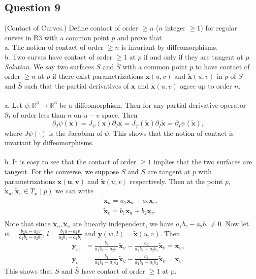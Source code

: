 \documentclass[12pt]{article}
\begin{document}
\subsection*{Question 9}
(Contact of Curves.) Define contact of order $\geq n$ ($n$ integer $\geq 1$) for regular curves in R3 with a common point $p$ and prove that\\
a. The notion of contact of order $\geq n$ is invariant by diffeomorphisms.\\
b. Two curves have contact of order $\geq 1$ at $p$ if and only if they are tangent at $p$.\\

\textit{Solution.} We say two surfaces $S$ and $\bar{S}$ with a common point $p$ to have contact of order $\geq n$ at $p$ if there exist parametrizations $\mathbf{x}(u, v)$ and $\mathbf{\tilde{x}}(u,v)$ in $p$ of $S$ and $\bar{S}$ such that the partial derivatives of $\mathbf{x}$ and $\mathbf{\tilde{x}}(u,v)$ agree up to order $n$.\\\\
a. Let $\psi:\mathbb{R}^3 \to \mathbb{R}^3$ be a diffeomorphism. Then for any partial derivative operator $\partial_I$ of order less than $n$ on $u-v$ space. Then \begin{equation*}
    \partial_I\psi(\mathbf{x}) = J_\psi(\mathbf{x})\partial_I\mathbf{x} = J_\psi(\mathbf{\tilde{x}})\partial_I\mathbf{\tilde{x}} = \partial_I\psi(\mathbf{\tilde{x}}),
\end{equation*}
where $J\psi(\cdot)$ is the Jacobian of $\psi$. This shows that the notion of contact is invariant by diffeomorphisms.\\\\
b. It is easy to see that the contact of order $\geq 1$ implies that the two surfaces are tangent. For the converse, we suppose $S$ and $\bar{S}$ are tangent at $p$ with parametrizations $\mathbf{x(u,v)}$ and $\mathbf{\tilde{x}}(u,v)$ respectively. Then at the point $p$, $\mathbf{\tilde{x}}_u, \mathbf{\tilde{x}}_v \in T_{\mathbf{x}}(p)$ we can write \begin{align*}
    &\mathbf{\tilde{x}}_u = a_1 \mathbf{x}_u + a_2 \mathbf{x}_v,\\
    &\mathbf{\tilde{x}}_v = b_1 \mathbf{x}_u + b_2 \mathbf{x}_v.\\
\end{align*}
Note that since $\mathbf{\tilde{x}}_u, \mathbf{\utilde{x}}_v$ are linearly independent, we have $a_1b_2-a_2b_1\neq 0$. Now let $w = \frac{b_2u-a_2v}{a_1b_2-a_2b_1}$, $l = \frac{b_1u-a_1v}{a_2b_1-a_1b_2}$ and $\mathbf{{y}}(w,l) = \mathbf{\tilde{x}}(u,v)$. Then \begin{align*}
    \mathbf{y}_w &= \frac{b_2}{a_1b_2-a_2b_1}\mathbf{\tilde{x}}_u-\frac{a_2}{a_1b_2-a_2b_1}\mathbf{\tilde{x}}_v=\mathbf{x}_u,\\
    \mathbf{y}_l &=
    \frac{b_1}{a_2b_1-a_1b_2}\mathbf{\tilde{x}}_u-\frac{a_1}{a_2b_1-a_1b_2}\mathbf{\tilde{x}}_v=\mathbf{x}_v.
\end{align*}
This shows that $S$ and $\bar{S}$ have contact of order $\geq 1$ at p. 
\end{document}
